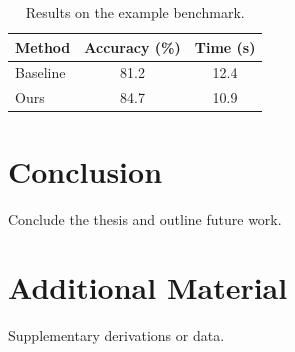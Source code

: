 \documentclass[12pt,a4paper,oneside]{book}
\begin{document}
\begin{table}[htbp]
  \centering
  \caption{Results on the example benchmark.}
  \label{tab:results}
  \begin{tabular}{lcc}
    \toprule
    Method   & Accuracy (\%) & Time (s) \\
    \midrule
    Baseline & 81.2          & 12.4     \\
    Ours     & 84.7          & 10.9     \\
    \bottomrule
  \end{tabular}
\end{table}

\chapter{Conclusion}
Conclude the thesis and outline future work.

\appendix
\chapter{Additional Material}
Supplementary derivations or data.

\backmatter

\end{document}
